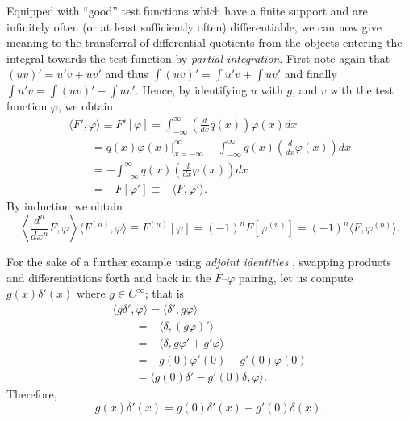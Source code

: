 Equipped with ``good'' test functions
which have a finite support and are
infinitely often (or at least sufficiently often) differentiable,
we can now give meaning to the transferral  of differential quotients from
the objects entering the integral towards the test function by {\em partial integration}.
First note again that $(uv)' = u'v+uv'$
and thus
$\int (uv)' = \int u'v+\int uv'$
and finally   $\int u'v = \int (uv)'  -\int uv'$.
Hence,     by identifying $u$ with $g$, and $v$ with the test function $\varphi$, we obtain
\begin{equation}
\begin{split}
\langle {F}' , \varphi \rangle \equiv {F}'\left[\varphi\right] =
\int_{-\infty}^\infty
\left( \frac{d}{dx} q(x)\right) \varphi (x) dx
\\
\qquad =
\left. q(x) \varphi (x) \right|_{x=-\infty}^\infty
- \int_{-\infty}^\infty
q(x)\left( \frac{d}{dx} \varphi (x) \right) dx \\
\qquad =
- \int_{-\infty}^\infty
q(x)\left( \frac{d}{dx} \varphi (x) \right) dx \\
\qquad =-F\left[\varphi  '\right] \equiv - \langle {F} , \varphi '\rangle .
\end{split}
\end{equation}
By induction we obtain
\begin{equation}
\left\langle \frac{d^{n}}{dx^{n}}{F} , \varphi \right\rangle
\langle {F}^{(n)} , \varphi \rangle \equiv F^{(n)}\left[\varphi\right]
 = (-1)^n F\left[\varphi  ^{(n)}\right]
 = (-1)^n   \langle {F} , \varphi^{(n)}\rangle.
\end{equation}


{
\color{blue}
\bexample
For the sake of a further example using {\em adjoint identities}
,
swapping products and differentiations forth and back
in the $F$--$\varphi$ pairing, let us compute
$g(x)\delta' (x)$ where $g \in C^\infty$; that is
\begin{equation}
\begin{split}
\langle g \delta'   , \varphi \rangle
=
\langle \delta'   , g  \varphi \rangle
\\
\qquad =
- \langle \delta   , (g  \varphi )'\rangle
\\
\qquad =
- \langle \delta   ,  g  \varphi  '+ g'  \varphi  \rangle
\\
\qquad =
-  g(0)  \varphi ' (0) - g'(0)  \varphi(0)
\\
\qquad =
  \langle g(0) \delta '   -  g'(0)\delta , \varphi   \rangle
.
\end{split}
\end{equation}
\eexample
}
Therefore,
\begin{equation}
g(x)\delta' (x)=g(0) \delta '(x)   -  g'(0)\delta (x) .
\label{2012-m-ch-di-sederi}
\end{equation}




